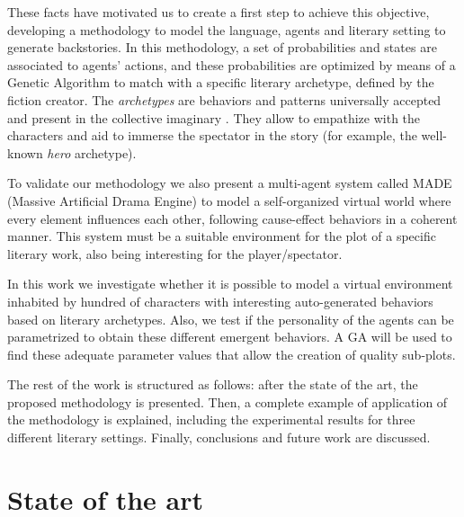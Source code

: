 \documentclass[letterpaper]{article}
\begin{document}
These facts have motivated us to create a first step to achieve this objective, developing a methodology to model the language, agents and literary setting to generate backstories. In this methodology, a set of probabilities and 
states are associated to agents' actions, and these probabilities are
optimized by means of a Genetic Algorithm \citep{GAs_Goldberg89} to match with a
specific literary archetype, defined by the fiction creator. The {\em
archetypes} are behaviors and patterns universally accepted and
present in the collective imaginary
 \citep{ArchetypesGarry05}. They allow to empathize  
with the characters and aid to immerse the spectator in the story
(for example, the well-known {\em hero} archetype).






To validate our methodology we also present a multi-agent system called
MADE (Massive Artificial Drama Engine) to model a self-organized
virtual world where every element influences each other, following
cause-effect behaviors in a coherent manner. This system must be
a suitable environment for the plot of a specific literary work, also being
interesting for the player/spectator. 

In this work we investigate whether it is possible to model a virtual environment inhabited by hundred of characters with interesting auto-generated behaviors based on literary archetypes. Also, we test if the personality of the agents can be parametrized to obtain these different emergent behaviors. A GA will be used to find these adequate parameter values that allow the creation of quality sub-plots.


The rest of the work is structured as follows: after the state of the art, the proposed methodology is presented. Then, a complete example of application of the methodology is explained, including the experimental results for three different literary settings. Finally, conclusions and future work are discussed.

\section{State of the art}
\label{sec:soa}
\end{document}
